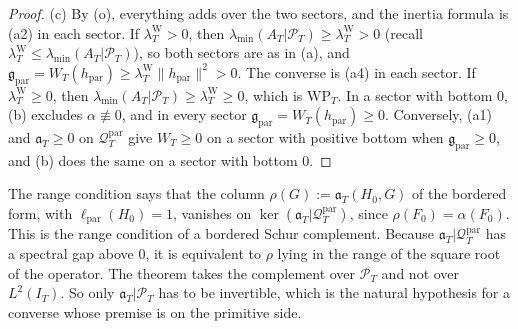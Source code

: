 \documentclass[11pt]{amsart}
\theoremstyle{definition}
\theoremstyle{remark}
\newcommand{\PT}{\mathcal P_T}
\newcommand{\IT}{I_T}
\newcommand{\lamW}{\lambda^{\mathrm W}_T}
\newcommand{\lamA}{\lambda_{\min}(A_T|\PT)}
\begin{document}
\begin{proof}
(c) By (o), everything adds over the two sectors, and the inertia formula is (a2) in each sector. If
$\lamW>0$, then $\lamA\ge\lamW>0$ (recall $\lamW\le\lamA$), so both sectors are as in (a), and
$\mathfrak g_{\mathrm{par}}=W_T(h_{\mathrm{par}})\ge\lamW\|h_{\mathrm{par}}\|^2>0$. The converse is (a4) in each sector. If $\lamW\ge0$,
then $\lamA\ge\lamW\ge0$, which is $\mathrm{WP}_T$. In a sector with bottom $0$, (b) excludes $\alpha\not\equiv0$, and
in every sector $\mathfrak g_{\mathrm{par}}=W_T(h_{\mathrm{par}})\ge0$. Conversely, (a1) and $\mathfrak a_T\ge0$ on
$\mathcal Q^{\mathrm{par}}_T$ give $W_T\ge0$ on a sector with positive bottom when $\mathfrak g_{\mathrm{par}}\ge0$, and (b) does the
same on a sector with bottom $0$.
\end{proof}

The range condition says that the column $\rho(G):=\mathfrak a_T(H_0,G)$ of the bordered form, with
$\ell_{\mathrm{par}}(H_0)=1$, vanishes on $\ker(\mathfrak a_T|\mathcal Q^{\mathrm{par}}_T)$, since $\rho(F_0)=\alpha(F_0)$. This is the
range condition of a bordered Schur complement. Because $\mathfrak a_T|\mathcal Q^{\mathrm{par}}_T$ has a spectral gap above
$0$, it is equivalent to $\rho$ lying in the range of the square root of the operator. The theorem takes
the complement over $\PT$ and not over $L^2(\IT)$. So only $\mathfrak a_T|\PT$ has to be invertible, which is
the natural hypothesis for a converse whose premise is on the primitive side.
\end{document}
